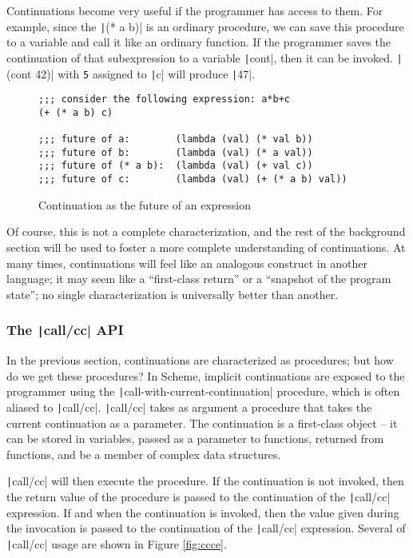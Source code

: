 \documentclass[]{article}
\begin{document}
Continuations become very useful if the programmer has access to them. For example, since the \texttt|(* a b)| is an ordinary procedure, we can save this procedure to a variable and call it like an ordinary function. If the programmer saves the continuation of that subexpression to a variable \texttt|cont|, then it can be invoked. \texttt|(cont 42)| with \texttt{5} assigned to \texttt|c| will produce \texttt|47|.

\begin{figure}
  \centering
\begin{verbatim}
;;; consider the following expression: a*b+c
(+ (* a b) c)

;;; future of a:        (lambda (val) (* val b))
;;; future of b:        (lambda (val) (* a val))
;;; future of (* a b):  (lambda (val) (+ val c))
;;; future of c:        (lambda (val) (+ (* a b) val))
\end{verbatim}
  \caption{Continuation as the future of an expression}
  \label{fig:cexp}
\end{figure}

Of course, this is not a complete characterization, and the rest of the background section will be used to foster a more complete understanding of continuations. At many times, continuations will feel like an analogous construct in another language; it may seem like a ``first-class return'' or a ``snapshot of the program state''; no single characterization is universally better than another.

\subsubsection{The \texttt|call/cc| API}
\label{sec:cacc}

In the previous section, continuations are characterized as procedures; but how do we get these procedures? In Scheme, implicit continuations are exposed to the programmer using the \texttt|call-with-current-continuation| procedure, which is often aliased to \texttt|call/cc|. \texttt|call/cc| takes as argument a procedure that takes the current continuation as a parameter. The continuation is a first-class object -- it can be stored in variables, passed as a parameter to functions, returned from functions, and be a member of complex data structures.

\texttt|call/cc| will then execute the procedure. If the continuation is not invoked, then the return value of the procedure is passed to the continuation of the \texttt|call/cc| expression. If and when the continuation is invoked, then the value given during the invocation is passed to the continuation of the \texttt|call/cc| expression. Several of \texttt|call/cc| usage are shown in Figure \ref{fig:ccce}.
\end{document}
